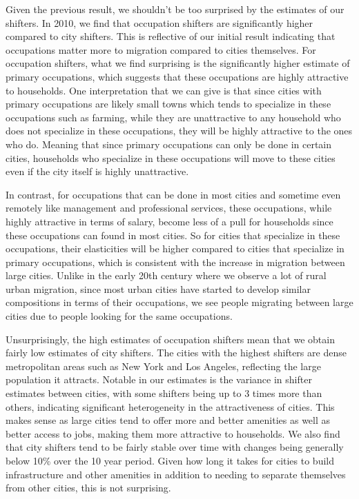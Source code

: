 \documentclass[10pt]{article}
\begin{document}
Given the previous result, we shouldn't be too surprised by the estimates of our shifters. In 2010, we find that occupation shifters are significantly higher compared to city shifters. This is reflective of our initial result indicating that occupations matter more to migration compared to cities themselves. For occupation shifters, what we find surprising is the significantly higher estimate of primary occupations, which suggests that these occupations are highly attractive to households. One interpretation that we can give is that since cities with primary occupations are likely small towns which tends to specialize in these occupations such as farming, while they are unattractive to any household who does not specialize in these occupations, they will be highly attractive to the ones who do. Meaning that since primary occupations can only be done in certain cities, households who specialize in these occupations will move to these cities even if the city itself is highly unattractive.

In contrast, for occupations that can be done in most cities and sometime even remotely like management and professional services, these occupations, while highly attractive in terms of salary, become less of a pull for households since these occupations can found in most cities. So for cities that specialize in these occupations, their elasticities will be higher compared to cities that specialize in primary occupations, which is consistent with the increase in migration between large cities. Unlike in the early 20th century where we observe a lot of rural urban migration, since most urban cities have started to develop similar compositions in terms of their occupations, we see people migrating between large cities due to people looking for the same occupations.

Unsurprisingly, the high estimates of occupation shifters mean that we obtain fairly low estimates of city shifters. The cities with the highest shifters are dense metropolitan areas such as New York and Los Angeles, reflecting the large population it attracts. Notable in our estimates is the variance in shifter estimates between cities, with some shifters being up to 3 times more than others, indicating significant heterogeneity in the attractiveness of cities. This makes sense as large cities tend to offer more and better amenities as well as better access to jobs, making them more attractive to households. We also find that city shifters tend to be fairly stable over time with changes being generally below 10\% over the 10 year period. Given how long it takes for cities to build infrastructure and other amenities in addition to needing to separate themselves from other cities, this is not surprising.
\end{document}
